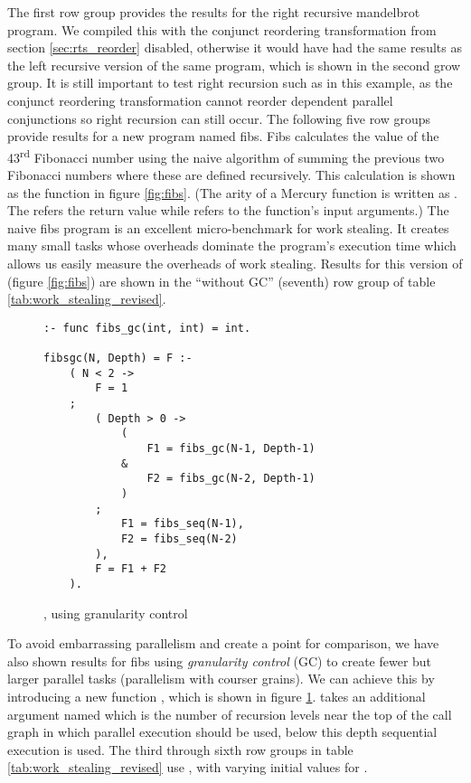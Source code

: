 The first row group provides the results for the
right recursive mandelbrot program.
We compiled this with the conjunct reordering transformation from section
\ref{sec:rts_reorder} disabled,
otherwise it would have had the same results as the left recursive version
of the same program,
which is shown in the second grow group.
It is still important to test right recursion such as in this example,
as the conjunct reordering transformation cannot reorder dependent parallel
conjunctions so right recursion can still occur.
The following five row groups provide results for a new program named fibs.
Fibs calculates the value of the 43\textsuperscript{rd} Fibonacci number
using the naive algorithm of summing the previous two
Fibonacci numbers where these are defined recursively.
This calculation is shown as the function \fibs in figure \ref{fig:fibs}.
    (The arity of a Mercury function is written as .
    The  refers the return value while  refers to the
    function's input arguments.)
The naive fibs program is an excellent micro-benchmark for work stealing.
It creates many small tasks whose overheads dominate the program's execution
time which allows us easily measure the overheads of work stealing.
Results for this version of \fibs (figure \ref{fig:fibs})
are shown in the ``without GC'' (seventh) row group of table
\ref{tab:work_stealing_revised}.


\begin{figure}
\begin{verbatim}
:- func fibs_gc(int, int) = int.

fibsgc(N, Depth) = F :-
    ( N < 2 ->
        F = 1
    ;
        ( Depth > 0 ->
            (
                F1 = fibs_gc(N-1, Depth-1)
            &
                F2 = fibs_gc(N-2, Depth-1)
            )
        ;
            F1 = fibs_seq(N-1),
            F2 = fibs_seq(N-2)
        ),
        F = F1 + F2
    ).
\end{verbatim}
\caption{\fibsgc, \fibs using granularity control}
\label{fig:fibsgc}
\end{figure}

To avoid embarrassing parallelism and create a point for comparison,
we have also shown results for fibs using \emph{granularity control} (GC) to
create fewer but larger parallel tasks
(parallelism with courser grains).
We can achieve this by introducing a new function \fibsgc,
which is shown in figure \ref{fig:fibsgc}.
\fibsgc takes an additional argument named \Depth which is
the number of recursion levels near the top of the call graph in
which parallel execution should be used,
below this depth sequential execution is used.
The third through sixth row groups in table
\ref{tab:work_stealing_revised} use \fibsgc, with varying initial values for
\Depth.

